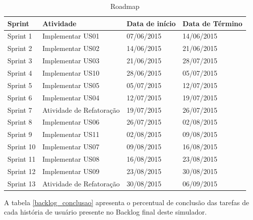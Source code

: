 \begin{table}[!htb]
\centering
\caption{Roadmap}
\label{cronograma_sprints}
\begin{tabular}{|l|l|l|l|}
\hline
Sprint    & Atividade        			& Data de início & Data de Término \\ \hline
Sprint 1  & Implementar US01 			& 07/06/2015     & 14/06/2015      \\ \hline
Sprint 2  & Implementar US02 			& 14/06/2015     & 21/06/2015      \\ \hline
Sprint 3  & Implementar US03 			& 21/06/2015     & 28/07/2015      \\ \hline
Sprint 4  & Implementar US10 			& 28/06/2015     & 05/07/2015      \\ \hline
Sprint 5  & Implementar US05 			& 05/07/2015     & 12/07/2015      \\ \hline
Sprint 6  & Implementar US04 			& 12/07/2015     & 19/07/2015      \\ \hline
Sprint 7  & Atividade de Refatoração		& 19/07/2015	 	 & 26/07/2015	  \\ \hline
Sprint 8  & Implementar US06 			& 26/07/2015     & 02/08/2015      \\ \hline
Sprint 9  & Implementar US11 			& 02/08/2015     & 09/08/2015      \\ \hline
Sprint 10 & Implementar US07 			& 09/08/2015     & 16/08/2015      \\ \hline
Sprint 11 & Implementar US08 			& 16/08/2015     & 23/08/2015      \\ \hline
Sprint 12 & Implementar US09 			& 23/08/2015     & 30/08/2015      \\ \hline
Sprint 13 & Atividade de Refatoração		& 30/08/2015     & 06/09/2015	   \\ \hline
\end{tabular}
\end{table}

A tabela \ref{backlog_conclusao} apresenta o percentual de conclusão das tarefas de cada história de usuário presente no Backlog final deste simulador.

